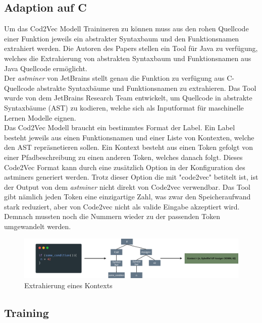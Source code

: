 \documentclass[12pt,letterpaper,ngerman]{article}
\begin{document}
\subsection{Adaption auf C}
Um das Cod2Vec Modell Trainineren zu können muss aus den rohen Quellcode einer
Funktion jeweils ein abstrakter Syntaxbaum und den Funktionsnamen extrahiert 
werden. Die Autoren des Papers stellen ein Tool für Java zu verfügung, welches
die Extrahierung von abstrakten Syntaxbaum und Funktionsnamen aus Java Quellcode
ermöglicht.\\
Der \textit{astminer} von JetBrains stellt genau die Funktion zu verfügung
aus C-Quellcode abstrakte Syntaxbäume und Funktionsnamen zu extrahieren. Das
Tool wurde von dem JetBrains Research Team entwickelt, 
um Quellcode in abstrakte Syntaxbäume (AST) zu kodieren, 
welche sich als Inputformat für maschinelle Lernen Modelle eignen. \\
Das Cod2Vec
Modell braucht ein bestimmtes Format der Label. Ein Label besteht jeweils aus
einen Funktionsnamen und einer Liste von Kontexten, welche
den AST repräsnetieren sollen. Ein Kontext besteht aus einen Token gefolgt von
einer Pfadbeschreibung zu einen anderen Token, welches danach folgt.
Dieses Code2Vec Format kann durch eine zusätzlich Option in der Konfiguration
des astminers generiert werden. Trotz dieser Option die mit "code2vec" betitelt
ist, ist der Output von dem \textit{astminer} nicht direkt von Code2vec
verwendbar. Das Tool gibt nämlich jeden Token eine einzigartige Zahl, was zwar
den Speicheraufwand stark reduziert, aber von Code2vec nicht als valide Eingabe
akzeptiert wird. Demnach mussten noch die Nummern wieder zu der passenden Token
umgewandelt werden.
\begin{figure}[H]
  \begin{center}
    \includegraphics[scale=0.2]{abb/ast-extraction-example.drawio.png}
  \end{center}
  \caption{Extrahierung eines Kontexts}
\end{figure}
\subsection{Training}
\end{document}
